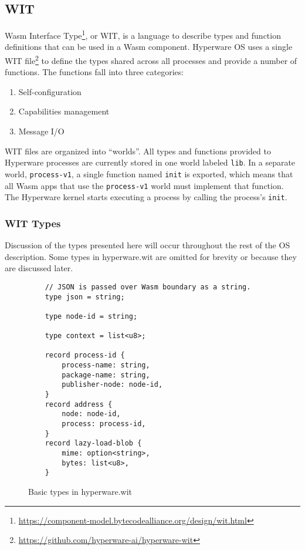 \documentclass[runningheads]{llncs}
\begin{document}
\subsection{WIT}
\label{sec:oswit}

Wasm Interface Type\footnote{\url{https://component-model.bytecodealliance.org/design/wit.html}}, or WIT, is a language to describe types and function definitions that can be used in a Wasm component.
Hyperware OS uses a single WIT file\footnote{\url{https://github.com/hyperware-ai/hyperware-wit}} to define the types shared across all processes and provide a number of functions.
The functions fall into three categories:
\begin{enumerate}
    \item Self-configuration
    \item Capabilities management
    \item Message I/O
\end{enumerate}

WIT files are organized into ``worlds''.
All types and functions provided to Hyperware processes are currently stored in one world labeled \verb|lib|.
In a separate world, \verb|process-v1|, a single function named \verb|init| is exported, which means that all Wasm apps that use the \verb|process-v1| world must implement that function.
The Hyperware kernel starts executing a process by calling the process's \verb|init|.

\subsubsection{WIT Types}
\label{sec:oswittypes}

Discussion of the types presented here will occur throughout the rest of the OS description.
Some types in hyperware.wit are omitted for brevity or because they are discussed later.

\begin{figure}[H]
    \centering
    \begin{verbatim}
    // JSON is passed over Wasm boundary as a string.
    type json = string;

    type node-id = string;

    type context = list<u8>;

    record process-id {
        process-name: string,
        package-name: string,
        publisher-node: node-id,
    }
    record address {
        node: node-id,
        process: process-id,
    }
    record lazy-load-blob {
        mime: option<string>,
        bytes: list<u8>,
    }
    \end{verbatim}
    \caption{Basic types in hyperware.wit}
    \label{fig:WIT Types 1}
\end{figure}
\end{document}
